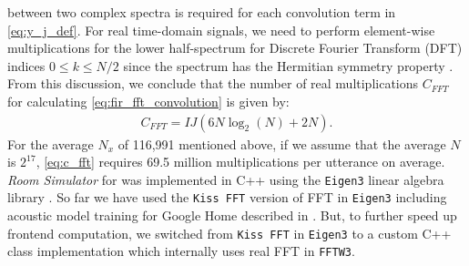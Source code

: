\documentclass[a4paper]{article}
\begin{document}
between two complex spectra is required for each convolution
term in \eqref{eq:y_j_def}.
For real time-domain signals, we need to perform element-wise
multiplications for the lower half-spectrum for
Discrete Fourier Transform (DFT) indices
$0 \le k \le N / 2$ since the spectrum has the Hermitian symmetry
property \cite{A_V_Oppenheim_PrenticeHall_1999}.
From this discussion, we conclude that the number of real multiplications
$C_{\textit{FFT}}$ for calculating \eqref{eq:fir_fft_convolution} is given by:
\begin{align}
  C_{\textit{FFT}} = I J \left(6 N \log_2(N) + 2 N\right).
  \label{eq:c_fft}
\end{align}
For the average $N_x$ of 116,991 mentioned above,
if we assume that the average $N$ is $2 ^ {17}$,  \eqref{eq:c_fft} 
requires 69.5 million multiplications per utterance on average. 
\textit{Room Simulator} for \cite{C_Kim_INTERSPEECH_2017_1, B_Li_INTERSPEECH_2017_1}
was implemented in C++ using the \texttt{Eigen3} linear algebra library \cite{eigenweb}.
So far we have used the \texttt{Kiss FFT} version of FFT in \texttt{Eigen3}
including acoustic model training for Google Home described in
\cite{C_Kim_INTERSPEECH_2017_1, B_Li_INTERSPEECH_2017_1}.
But, to further speed up frontend computation, we switched from
\texttt{Kiss FFT} in \texttt{Eigen3} to a custom  C++ class
implementation which internally uses real FFT in \texttt{FFTW3}.
\end{document}
